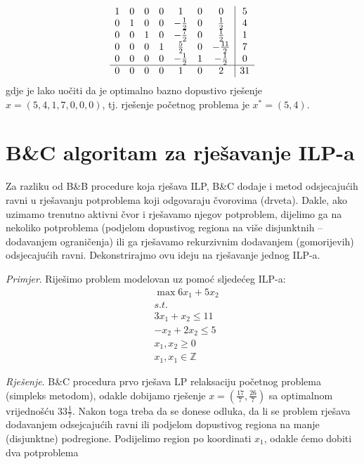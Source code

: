 \documentclass[a4paper, utf8, 11pt, colorlinks]{book}
\begin{document}
$$ \begin{array}{ccccccc| c}
    1    &   0   &   0   &  0 &  1  &   0    &    0    & 5  \\
0    &   1   &   0   &  0   &   -\frac{1}{2}    &   0   & \frac{1}{2} & 4 \\
0    &   0   &   1   &  0   &   -\frac{7}{2}    &   0   & \frac{1}{2} & 1 \\
0    &   0   &   0   &  1  &   \frac{5}{2}    &  0 &  -\frac{11}{2}    & 7 \\ 
0    &   0   &   0   &   0 &  -\frac{1}{2}    &   1   & - \frac{1}{2} & 0\\ \hline
0    &   0   &   0   &  0  &   1    &    0   & 2 & 31  
\end{array} 
$$
gdje je lako uočiti da je optimalno bazno dopustivo rješenje $x=(5, 4, 1, 7, 0, 0, 0 )$, tj. rješenje početnog problema je $x^*=(5, 4)$.

\section{B\&C algoritam za rješavanje ILP-a}
Za razliku od B\&B procedure koja rješava ILP, B\&C dodaje  i metod odsjecajućih ravni u rješavanju  potproblema koji odgovaraju čvorovima (drveta). Dakle, ako  uzimamo trenutno aktivni čvor i rješavamo njegov potproblem, dijelimo ga na nekoliko potproblema (podjelom dopustivog regiona na više disjunktnih -- dodavanjem ograničenja) ili ga rješavamo rekurzivnim dodavanjem (gomorijevih) odsjecajućih ravni. Dekonstrirajmo ovu ideju na rješavanje jednog ILP-a.

\emph{Primjer}.  Riješimo problem modelovan uz pomoć sljedećeg ILP-a:
\begin{align*}
    &\max 6 x_1 + 5 x_2 \\
    &  {s.t. } \\
    & 3x_1 + x_2 \leq 11 \\
    & - x_2 + 2 x_2 \leq 5 \\
    & x_1, x_2 \geq 0 \\
    & x_1, x_1 \in \mathbb{Z}
\end{align*}

\emph{Rješenje}. B\&C procedura prvo rješava LP relaksaciju početnog problema (simpleks metodom), odakle dobijamo rješenje $x=(\frac{17}{7}, \frac{26}{7})$
sa optimalnom vrijednošću $33\frac{1}{7}$. Nakon toga treba da se donese odluka, da li se problem rješava dodavanjem odsejcajućih ravni ili podjelom dopustivog regiona na manje (disjunktne) podregione. Podijelimo region po koordinati $x_1$, odakle ćemo dobiti dva potproblema 
\end{document}
